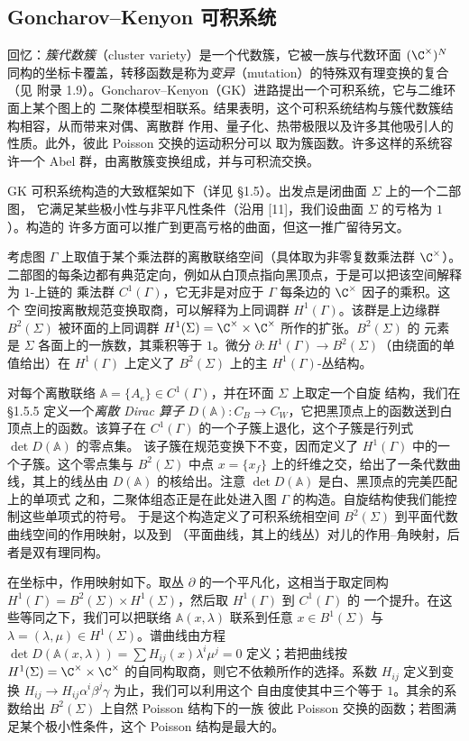 \subsection{Goncharov--Kenyon 可积系统}

回忆：\emph{簇代数簇}（cluster variety）是一个代数簇，它被一族与代数环面 $(\C^\times)^N$
同构的坐标卡覆盖，转移函数是称为\emph{变异}（mutation）的特殊双有理变换的复合（见
附录 1.9）。Goncharov--Kenyon（GK）进路提出一个可积系统，它与二维环面上某个图上的
二聚体模型相联系。结果表明，这个可积系统结构与簇代数簇结构相容，从而带来对偶、离散群
作用、量子化、热带极限以及许多其他吸引人的性质。此外，彼此 Poisson 交换的运动积分可以
取为簇函数。许多这样的系统容许一个 Abel 群，由离散簇变换组成，并与可积流交换。

GK 可积系统构造的大致框架如下（详见 §1.5）。出发点是闭曲面 $\Sigma$ 上的一个二部图，
它满足某些极小性与非平凡性条件（沿用 [11]，我们设曲面 $\Sigma$ 的亏格为 $1$）。构造的
许多方面可以推广到更高亏格的曲面，但这一推广留待另文。

考虑图 $\Gamma$ 上取值于某个乘法群的离散联络空间（具体取为非零复数乘法群 $\C^\times$）。
二部图的每条边都有典范定向，例如从白顶点指向黑顶点，于是可以把该空间解释为 $1$-上链的
乘法群 $C^1(\Gamma)$，它无非是对应于 $\Gamma$ 每条边的 $\C^\times$ 因子的乘积。这个
空间按离散规范变换取商，可以解释为上同调群 $H^1(\Gamma)$。该群是上边缘群 $B^2(\Sigma)$
被环面的上同调群 $H^1(\Sigma)=\C^\times\times\C^\times$ 所作的扩张。$B^2(\Sigma)$ 的
元素是 $\Sigma$ 各面上的一族数，其乘积等于 $1$。微分
$\partial:H^1(\Gamma)\to B^2(\Sigma)$（由绕面的单值给出）在 $H^1(\Gamma)$ 上定义了
$B^2(\Sigma)$ 上的主 $H^1(\Gamma)$-丛结构。

对每个离散联络 $\mathbb{A}=\{A_e\}\in C^1(\Gamma)$，并在环面 $\Sigma$ 上取定一个自旋
结构，我们在 §1.5.5 定义一个\emph{离散 Dirac 算子}
$D(\mathbb{A}):C_B\to C_W$，它把黑顶点上的函数送到白顶点上的函数。该算子在
$C^1(\Gamma)$ 的一个子簇上退化，这个子簇是行列式 $\det D(\mathbb{A})$ 的零点集。
该子簇在规范变换下不变，因而定义了 $H^1(\Gamma)$ 中的一个子簇。这个零点集与
$B^2(\Sigma)$ 中点 $x=\{x_f\}$ 上的纤维之交，给出了一条代数曲线，其上的线丛由
$D(\mathbb{A})$ 的核给出。注意 $\det D(\mathbb{A})$ 是白、黑顶点的完美匹配上的单项式
之和，二聚体组态正是在此处进入图 $\Gamma$ 的构造。自旋结构使我们能控制这些单项式的符号。
于是这个构造定义了可积系统相空间 $B^2(\Sigma)$ 到平面代数曲线空间的作用映射，以及到
（平面曲线，其上的线丛）对儿的作用--角映射，后者是双有理同构。

在坐标中，作用映射如下。取丛 $\partial$ 的一个平凡化，这相当于取定同构
$H^1(\Gamma)=B^2(\Sigma)\times H^1(\Sigma)$，然后取 $H^1(\Gamma)$ 到 $C^1(\Gamma)$ 的
一个提升。在这些等同之下，我们可以把联络 $\mathbb{A}(x,\lambda)$ 联系到任意
$x\in B^1(\Sigma)$ 与 $\lambda=(\lambda,\mu)\in H^1(\Sigma)$。谱曲线由方程
$\det D(\mathbb{A}(x,\lambda))=\sum H_{ij}(x)\lambda^i\mu^j=0$ 定义；若把曲线按
$H^1(\Sigma)=\C^\times\times\C^\times$ 的自同构取商，则它不依赖所作的选择。系数
$H_{ij}$ 定义到变换 $H_{ij}\to H_{ij}\alpha^i\beta^j\gamma$ 为止，我们可以利用这个
自由度使其中三个等于 $1$。其余的系数给出 $B^2(\Sigma)$ 上自然 Poisson 结构下的一族
彼此 Poisson 交换的函数；若图满足某个极小性条件，这个 Poisson 结构是最大的。

